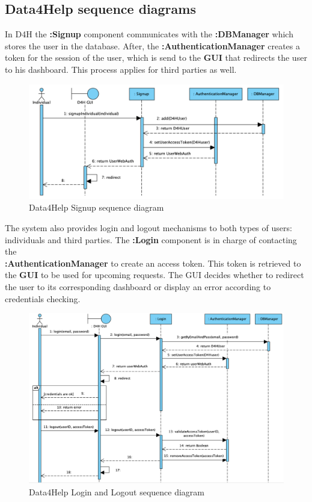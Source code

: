 \documentclass[a4paper, hidelinks, 12pt]{report}
\begin{document}
	\subsection{Data4Help sequence diagrams}
	In D4H the \textbf{:Signup} component communicates with the \textbf{:DBManager} which stores the user in the database. After, the \textbf{:AuthenticationManager} creates a token for the session of the user, which is send to the \textbf{GUI} that redirects the user to his dashboard. This process applies for third parties as well. \\
	
	\begin{figure}[H]
		\centering
		\includegraphics[width=1\textwidth]{diagrams/sequence_diagrams/d4h_signup.png}
		\caption[Data4Help Signup sequence diagram]{Data4Help Signup sequence diagram}
		\label{fig:d4h_seq_signup}
	\end{figure}
	
	The system also provides login and logout mechanisms to both types of users: individuals and third parties. The \textbf{:Login} component is in charge of contacting the \\ \textbf{:AuthenticationManager} to create an access token. This token is retrieved to the \textbf{GUI} to be used for upcoming requests. The GUI decides whether to redirect the user to its corresponding dashboard or display an error according to credentials checking. \\
	
	\begin{figure}[H]
		\centering
		\includegraphics[width=1\textwidth]{diagrams/sequence_diagrams/d4h_login_logout.png}
		\caption[Data4Help Login and Logout sequence diagram]{Data4Help Login and Logout sequence diagram}
		\label{fig:d4h_seq_login_logout}
	\end{figure}
	
\end{document}
